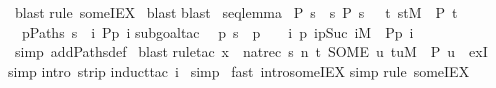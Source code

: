 \begin{isabellebody}
\ blast{\isacharparenright}\isanewline
{}rule\ someIEX{\isacharparenright}\isanewline
\ blast{\isacharparenright}\isanewline
{}blast{\isacharparenright}\isanewline
\isanewline
{}\ seq{\isacharunderscore}lemma{\isacharcolon}\isanewline
{\isachardoublequote}{\isasymlbrakk}\ P\ s{\isacharsemicolon}\ {\isasymforall}\ s{\isachardot}\ P\ s\ {\isasymlongrightarrow}\ {\isacharparenleft}{\isasymexists}\ t{\isachardot}\ {\isacharparenleft}s{\isacharcomma}t{\isacharparenright}{\isasymin}M\ {\isasymand}\ P\ t{\isacharparenright}\ {\isasymrbrakk}\ {\isasymLongrightarrow}\isanewline
\ {\isasymexists}\ p{\isasymin}Paths\ s{\isachardot}\ {\isasymforall}\ i{\isachardot}\ P{\isacharparenleft}p\ i{\isacharparenright}{\isachardoublequote}\isanewline
{}subgoal{\isacharunderscore}tac\isanewline
\ {\isachardoublequote}{\isasymexists}\ p{\isachardot}\ s\ {\isacharequal}\ p\ \ {\isasymand}\ {\isacharparenleft}{\isasymforall}\ i{\isachardot}\ {\isacharparenleft}p\ i{\isacharcomma}p{\isacharparenleft}Suc\ i{\isacharparenright}{\isacharparenright}{\isasymin}M\ {\isasymand}\ P{\isacharparenleft}p\ i{\isacharparenright}{\isacharparenright}{\isachardoublequote}{\isacharparenright}\isanewline
\ simp\ add{\isacharcolon}Paths{\isacharunderscore}def{\isacharparenright}\isanewline
\ blast{\isacharparenright}\isanewline
{}rule{\isacharunderscore}tac\ x\ {\isacharequal}\ {\isachardoublequote}nat{\isacharunderscore}rec\ s\ {\isacharparenleft}{\isasymlambda}n\ t{\isachardot}\ SOME\ u{\isachardot}\ {\isacharparenleft}t{\isacharcomma}u{\isacharparenright}{\isasymin}M\ {\isasymand}\ P\ u{\isacharparenright}{\isachardoublequote}\ \ exI{\isacharparenright}\isanewline
{}simp{\isacharparenright}\isanewline
{}intro\ strip{\isacharparenright}\isanewline
{}induct{\isacharunderscore}tac\ i{\isacharparenright}\isanewline
\ simp{\isacharparenright}\isanewline
\ fast\ intro{\isacharcolon}someIEX{\isacharparenright}\isanewline
{}simp{\isacharparenright}\isanewline
{}rule\ someIEX{\isacharparenright}\isanewline

\end{isabellebody}
